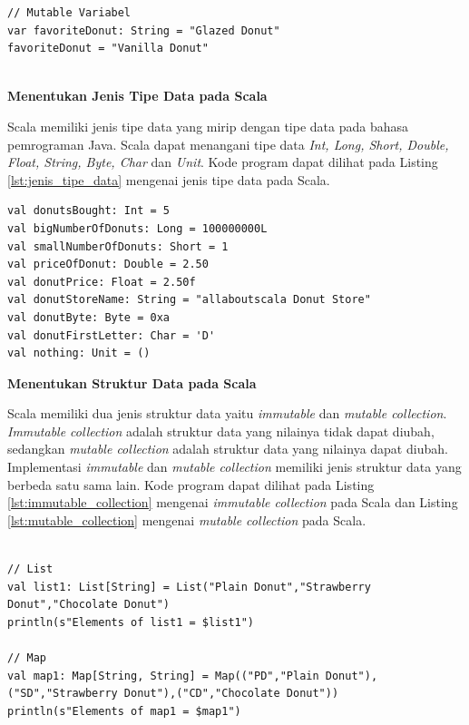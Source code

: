 \documentclass[a4paper,twoside]{article}
\begin{document}
\begin{enumerate}
\begin{lstlisting}[basicstyle=\ttfamily, frame=single,
	columns=fullflexible, keepspaces=true, breaklines=true, label=lst:jenis_variabel, caption=Menentukan Jenis Variabel pada Scala]
// Mutable Variabel
var favoriteDonut: String = "Glazed Donut"
favoriteDonut = "Vanilla Donut"


\end{lstlisting}

\textbf{Menentukan Jenis Tipe Data pada Scala}

Scala memiliki jenis tipe data yang mirip dengan tipe data pada bahasa pemrograman Java. Scala dapat menangani tipe data \textit{Int, Long, Short, Double, Float, String, Byte, Char} dan \textit{Unit}. Kode program dapat dilihat pada Listing \ref{lst:jenis_tipe_data} mengenai jenis tipe data pada Scala.

\begin{lstlisting}[basicstyle=\ttfamily, frame=single,
	columns=fullflexible, keepspaces=true, breaklines=true, label=lst:jenis_tipe_data, caption=Menentukan Jenis Tipe Data pada Scala]
val donutsBought: Int = 5
val bigNumberOfDonuts: Long = 100000000L
val smallNumberOfDonuts: Short = 1
val priceOfDonut: Double = 2.50
val donutPrice: Float = 2.50f
val donutStoreName: String = "allaboutscala Donut Store"
val donutByte: Byte = 0xa
val donutFirstLetter: Char = 'D'
val nothing: Unit = ()

\end{lstlisting}

\textbf{Menentukan Struktur Data pada Scala}

Scala memiliki dua jenis struktur data yaitu \textit{immutable} dan \textit{mutable collection}. \textit{Immutable collection} adalah struktur data yang nilainya tidak dapat diubah, sedangkan \textit{mutable collection} adalah struktur data yang nilainya dapat diubah. Implementasi \textit{immutable} dan \textit{mutable collection} memiliki jenis struktur data yang berbeda satu sama lain. Kode program dapat dilihat pada Listing \ref{lst:immutable_collection} mengenai \textit{immutable collection} pada Scala dan Listing \ref{lst:mutable_collection} mengenai \textit{mutable collection} pada Scala.

\begin{lstlisting}[basicstyle=\ttfamily, frame=single,
	columns=fullflexible, keepspaces=true, breaklines=true, label=lst:immutable_collection, caption=Membuat immutable collection pada Scala]

// List
val list1: List[String] = List("Plain Donut","Strawberry Donut","Chocolate Donut")
println(s"Elements of list1 = $list1")

// Map
val map1: Map[String, String] = Map(("PD","Plain Donut"),("SD","Strawberry Donut"),("CD","Chocolate Donut"))
println(s"Elements of map1 = $map1")
\end{lstlisting}


\end{enumerate}
\end{document}

